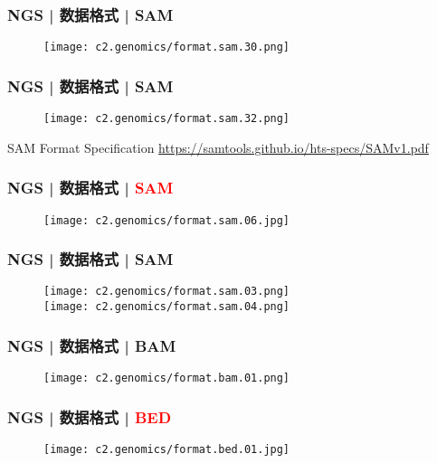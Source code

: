 \begin{frame}
  \frametitle{NGS | 数据格式 | SAM}
  \begin{figure}
    \centering
    \texttt{[image: c2.genomics/format.sam.30.png]}
  \end{figure}
\end{frame}

\begin{frame}
  \frametitle{NGS | 数据格式 | SAM}
  \begin{figure}
    \centering
    \texttt{[image: c2.genomics/format.sam.32.png]}
  \end{figure}
  \vspace{-0.8em}
  \begin{block}{SAM Format Specification}
    \href{https://samtools.github.io/hts-specs/SAMv1.pdf}{https://samtools.github.io/hts-specs/SAMv1.pdf}
  \end{block}
\end{frame}

\begin{frame}
  \frametitle{NGS | 数据格式 | \textcolor{red}{SAM}}
  \begin{figure}
    \centering
    \texttt{[image: c2.genomics/format.sam.06.jpg]}
  \end{figure}
\end{frame}

\begin{frame}
  \frametitle{NGS | 数据格式 | SAM}
  \begin{figure}
    \centering
    \texttt{[image: c2.genomics/format.sam.03.png]}\\
    \vspace{1em}
    \texttt{[image: c2.genomics/format.sam.04.png]}
  \end{figure}
\end{frame}

\begin{frame}
  \frametitle{NGS | 数据格式 | BAM}
  \begin{figure}
    \centering
    \texttt{[image: c2.genomics/format.bam.01.png]}
  \end{figure}
\end{frame}

\begin{frame}
  \frametitle{NGS | 数据格式 | \textcolor{red}{BED}}
  \begin{figure}
    \centering
    \texttt{[image: c2.genomics/format.bed.01.jpg]}
  \end{figure}
\end{frame}

